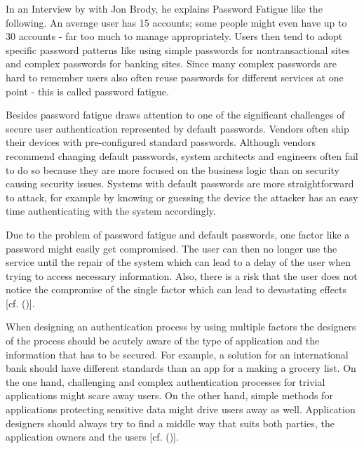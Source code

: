 In an Interview by \cite{Tomkins:2009:DPF} with Jon Brody, he explains Password Fatigue like the following. An average user has 15 accounts; some people might even have up to 30 accounts - far too much to manage appropriately. Users then tend to adopt specific password patterns like using simple passwords for nontransactional sites and complex passwords for banking sites. Since many complex passwords are hard to remember users also often reuse passwords for different services at one point - this is called password fatigue. 

Besides password fatigue \cite{Todorov:2007:MUI} draws attention to one of the significant challenges of secure user authentication represented by default passwords. Vendors often ship their devices with pre-configured standard passwords. Although vendors recommend changing default passwords, system architects and engineers often fail to do so because they are more focused on the business logic than on security causing security issues. Systems with default passwords are more straightforward to attack, for example by knowing or guessing the device the attacker has an easy time authenticating with the system accordingly. 


 Due to the problem of password fatigue and default passwords, one factor like a password might easily get compromised. The user can then no longer use the service until the repair of the system which can lead to a delay of the user when trying to access necessary information. Also, there is a risk that the user does not notice the compromise of the single factor which can lead to devastating effects [cf. (\cite{Dasgupta:2017:AUA})]. 

When designing an authentication process by using multiple factors the designers of the process should be acutely aware of the type of application and the information that has to be secured. For example, a solution for an international bank should have different standards than an app for a making a grocery list. On the one hand, challenging and complex authentication processes for trivial applications might scare away users. On the other hand, simple methods for applications protecting sensitive data might drive users away as well. Application designers should always try to find a middle way that suits both parties, the application owners and the users [cf. (\cite{NIST:2017:DIG})]. 

